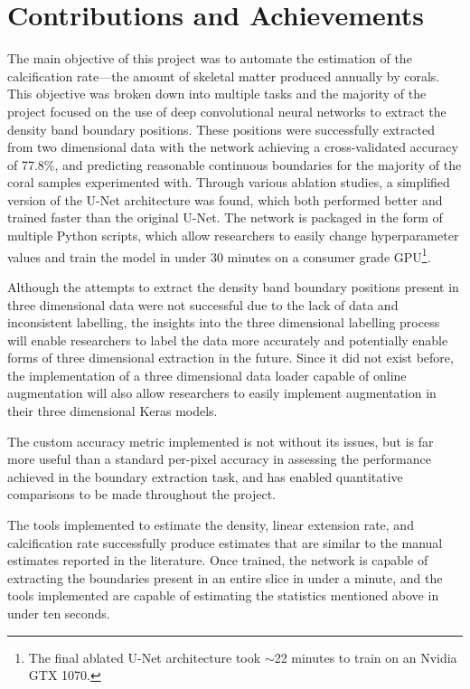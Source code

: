 \section{Contributions and Achievements}

The main objective of this project was to automate the estimation of the calcification rate---the amount of skeletal matter produced annually by corals. This objective was broken down into multiple tasks and the majority of the project focused on the use of deep convolutional neural networks to extract the density band boundary positions. These positions were successfully extracted from two dimensional data with the network achieving a cross-validated accuracy of 77.8\%, and predicting reasonable continuous boundaries for the majority of the coral samples experimented with. Through various ablation studies, a simplified version of the U-Net architecture was found, which both performed better and trained faster than the original U-Net. The network is packaged in the form of multiple Python scripts, which allow researchers to easily change hyperparameter values and train the model in under 30 minutes on a consumer grade GPU\footnote{The final ablated U-Net architecture took ${\sim}$22 minutes to train on an Nvidia GTX 1070.}.

Although the attempts to extract the density band boundary positions present in three dimensional data were not successful due to the lack of data and inconsistent labelling, the insights into the three dimensional labelling process will enable researchers to label the data more accurately and potentially enable forms of three dimensional extraction in the future. Since it did not exist before, the implementation of a three dimensional data loader capable of online augmentation will also allow researchers to easily implement augmentation in their three dimensional Keras models.

The custom accuracy metric implemented is not without its issues, but is far more useful than a standard per-pixel accuracy in assessing the performance achieved in the boundary extraction task, and has enabled quantitative comparisons to be made throughout the project.

The tools implemented to estimate the density, linear extension rate, and calcification rate successfully produce estimates that are similar to the manual estimates reported in the literature. Once trained, the network is capable of extracting the boundaries present in an entire slice in under a minute, and the tools implemented are capable of estimating the statistics mentioned above in under ten seconds.

